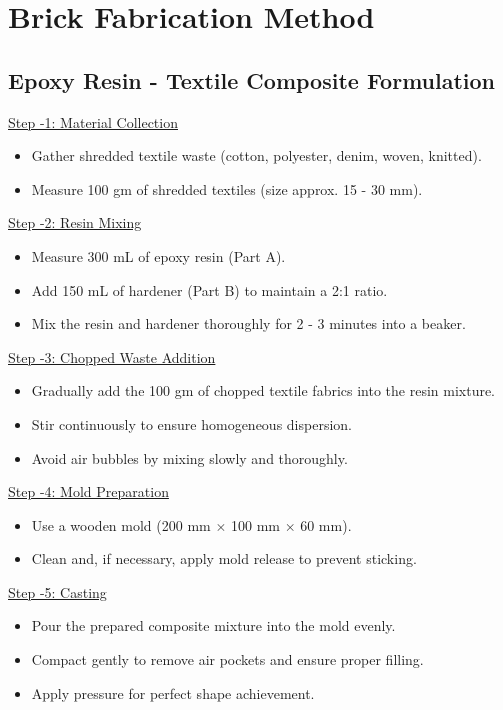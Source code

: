 \section{Brick Fabrication Method }

\subsection{Epoxy Resin - Textile Composite Formulation }

\noindent\underline{Step -1: Material Collection}
\begin{itemize}[leftmargin=1.5cm]
    \item Gather shredded textile waste (cotton, polyester, denim, woven, knitted).
    \item Measure 100 gm of shredded textiles (size approx. 15 - 30 mm).
\end{itemize}

\noindent\underline{Step -2: Resin Mixing }
\begin{itemize}[leftmargin=1.5cm]
    \item Measure 300 mL of epoxy resin (Part A). 
    \item Add 150 mL of hardener (Part B) to maintain a 2:1 ratio. 
    \item Mix the resin and hardener thoroughly for 2 - 3 minutes into a beaker. 
\end{itemize}

\noindent\underline{Step -3: Chopped Waste Addition}
\begin{itemize}[leftmargin=1.5cm]
    \item Gradually add the 100 gm of chopped textile fabrics into the resin mixture.
    \item Stir continuously to ensure homogeneous dispersion.
    \item Avoid air bubbles by mixing slowly and thoroughly.
\end{itemize}

\noindent\underline{Step -4: Mold Preparation}
\begin{itemize}[leftmargin=1.5cm]
    \item Use a wooden mold (200 mm $\times$ 100 mm $\times$ 60 mm).
    \item Clean and, if necessary, apply mold release to prevent sticking.
\end{itemize}

\noindent\underline{Step -5: Casting}
\begin{itemize}[leftmargin=1.5cm]
    \item Pour the prepared composite mixture into the mold evenly.
    \item Compact gently to remove air pockets and ensure proper filling.
    \item Apply pressure for perfect shape achievement.
\end{itemize}

